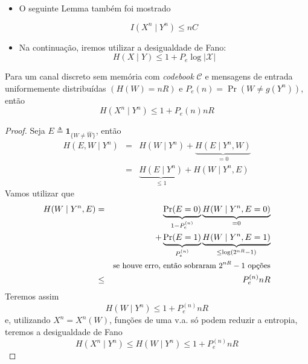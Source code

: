 \begin{frame}[allowframebreaks]
  
  \framebreak
  \begin{itemize}
  \item O seguinte Lemma também foi mostrado
	\begin{lemma}
	\begin{equation}
	I(X^n \mid Y^n) \leq nC
	\end{equation}
	\end{lemma}
  \item Na continuação, iremos utilizar a desigualdade de Fano:
	\begin{equation}
	H(X \mid Y) \leq 1 + P_e \log \vert \mathcal{X} \vert
	\end{equation}
  \end{itemize}
 
  \framebreak
 
  \begin{theorem}[Fano]
  Para um canal discreto sem memória com \textit{codebook} $\mathcal{C}$ e mensagens de entrada 
  uniformemente distribuídas $(H(W) = nR)$ e $P_e{(n)} = \Pr(W \neq g(Y^n))$, então
	\begin{equation}
	H(X^n \mid Y^n) \leq 1 + P_e{(n)} nR
	\end{equation}
  \end{theorem}
  \framebreak 
  \begin{proof}
  Seja $E \triangleq \mathbf{1}_{\{ W \neq \hat{W} \}}$, então
	\begin{eqnarray}
	H(E, W \mid Y^n) &=& H(W \mid Y^n) + \underbrace{H(E \mid Y^n , W)}_{=0} \nonumber \\
			&=& \underbrace{H(E \mid Y^n)}_{\leq 1} + H(W \mid Y^n , E)
	\end{eqnarray}
  \proofbreak
  Vamos utilizar que 
	\begin{eqnarray}
	H(W \mid Y^n , E) &=& \underbrace{\Pr(E=0)}_{1 - P_e^{(n)}} \underbrace{H(W \mid Y^n, E=0)}_{=0} \nonumber \\
			&& + \underbrace{\Pr(E=1)}_{P_e^{(n)}} \underbrace{H(W \mid Y^n, E=1)}_{\leq\log(2^{nR}-1)} \nonumber \\
			&& \text{\small se houve erro, então sobraram $2^{nR}-1$ opções} \nonumber \\
			&\leq& P_e^{(n)} nR
        \end{eqnarray}
  \proofbreak
  Teremos assim 
	\begin{equation}
	H(W \mid Y^n) \leq 1 + P_e^{(n)} nR
	\end{equation}
  e, utilizando $X^n = X^n(W)$, funções de uma v.a. só podem reduzir a entropia, teremos 
  a desigualdade de Fano
	\begin{equation}
	H(X^n \mid Y^n) \leq H(W \mid Y^n) \leq 1 + P_e^{(n)} nR
        \end{equation}


\end{proof}
\end{frame}
